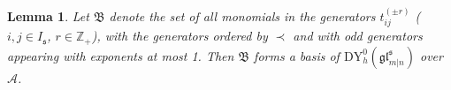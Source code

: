 \documentclass[a4paper,12pt]{article}
\newtheorem{lemm}[theo]{Lemma}
\numberwithin{equation}{section}
\begin{document}
\begin{lemm} 
Let $\mathfrak{B}$ denote the set of all monomials in the generators $t_{ij}^{(\pm r)}$ ($i,j\in I_{\mathfrak{s}}$, $r\in\mathbb{Z}_+$), with the generators ordered by $\prec$ and with odd generators appearing with exponents at most 1.
Then $\mathfrak{B}$ forms a basis of $\mathrm{DY}_{h}^{0}(\mathfrak{gl}^{\mathfrak{s}}_{m|n})$ over $\mathcal{A}$.
\end{lemm}
\end{document}
